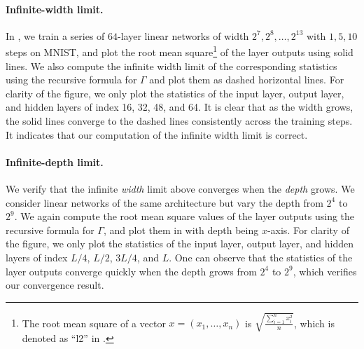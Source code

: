 \paragraph{Infinite-width limit.} In , we train a series of $64$-layer linear networks of width $2^7, 2^8, \ldots, 2^{13}$ with $1, 5, 10$ steps on MNIST, and plot the root mean square\footnote{The root mean square of a vector $x=(x_1,\ldots, x_n)$ is $\sqrt{\frac{\sum_{i=1}^n x_i^2}{n}}$, which is denoted as ``l2'' in .} of the layer outputs using solid lines. We also compute the infinite width limit of the corresponding statistics using the recursive formula for $\Gamma$ and plot them as dashed horizontal lines. For clarity of the figure, we only plot the statistics of the input layer, output layer, and hidden layers of index 16, 32, 48, and 64. It is clear that as the width grows, the solid lines converge to the dashed lines consistently across the training steps. It indicates that our computation of the infinite width limit is correct.

\paragraph{Infinite-depth limit.} We verify that the infinite \emph{width} limit above converges when the \emph{depth} grows. We consider linear networks of the same architecture but vary the depth from $2^4$ to $2^9$. We again compute the root mean square values of the layer outputs using the recursive formula for $\Gamma$, and plot them in  with depth being $x$-axis. For clarity of the figure, we only plot the statistics of the input layer, output layer, and hidden layers of index $L/4$, $L/2$, $3L/4$, and $L$. One can observe that the statistics of the layer outputs converge quickly when the depth grows from $2^4$ to $2^9$, which verifies our convergence result.

    

